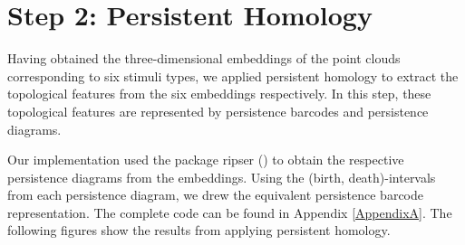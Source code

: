 \section{Step 2: Persistent Homology}

Having obtained the three-dimensional embeddings of the point clouds corresponding to six stimuli types, we applied persistent homology to extract the topological features from the six embeddings respectively. In this step, these topological features are represented by persistence barcodes and persistence diagrams.

Our implementation used the package ripser (\cite{ctralie2018ripser}) to obtain the respective persistence diagrams from the embeddings. Using the (birth, death)-intervals from each persistence diagram, we drew the equivalent persistence barcode representation. The complete code can be found in Appendix \ref{AppendixA}. The following figures show the results from applying persistent homology.
